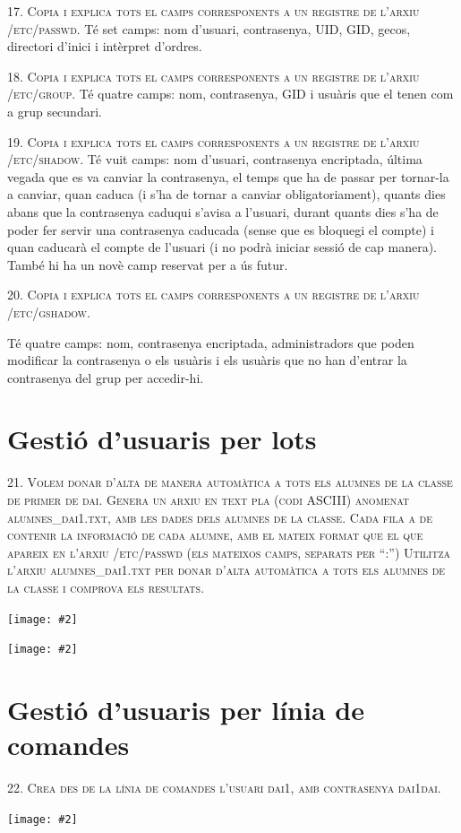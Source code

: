 \documentclass[a4paper,12pt]{article}
\newcommand{\mygraphic}[2][width=\textwidth]{\begin{center}
		\centering\texttt{[image: \#2]}\par
\end{center}}
\begin{document}
\textsc{17. Copia i explica tots el camps corresponents a un registre de l’arxiu /etc/passwd.}
Té set camps: nom d'usuari, contrasenya, UID, GID, gecos, directori d'inici i intèrpret d'ordres.

\textsc{18. Copia i explica tots el camps corresponents a un registre de l’arxiu /etc/group.}
Té quatre camps: nom, contrasenya, GID i usuàris que el tenen com a grup secundari.

\textsc{19. Copia i explica tots el camps corresponents a un registre de l’arxiu /etc/shadow.}
Té vuit camps: nom d'usuari, contrasenya encriptada, última vegada que es va canviar la contrasenya, el temps que ha de passar per tornar-la a canviar, quan caduca (i s'ha de tornar a canviar obligatoriament), quants dies abans que la contrasenya caduqui s'avisa a l'usuari, durant quants dies s'ha de poder fer servir una contrasenya caducada (sense que es bloquegi el compte) i quan caducarà el compte de l'usuari (i no podrà iniciar sessió de cap manera). També hi ha un novè camp reservat per a ús futur.

\textsc{20. Copia i explica tots el camps corresponents a un registre de l’arxiu /etc/gshadow.}

Té quatre camps: nom, contrasenya encriptada, administradors que poden modificar la contrasenya o els usuàris i els usuàris que no han d'entrar la contrasenya del grup per accedir-hi.

\section{Gestió d’usuaris per lots}
\textsc{21. Volem donar d’alta de manera automàtica a tots els alumnes de la classe de primer de dai. Genera un arxiu en text pla (codi ASCIII) anomenat alumnes\_dai1.txt, amb les dades dels alumnes de la classe. Cada fila a de contenir la informació de cada alumne, amb el mateix format que el que apareix en l’arxiu /etc/passwd (els mateixos camps, separats per “:”) Utilitza l’arxiu alumnes\_dai1.txt per donar d’alta automàtica a tots els alumnes de la classe i comprova els resultats.}
\mygraphic{imatges/21a.png}
\mygraphic{imatges/21b.png}

\newpage
\section{Gestió d’usuaris  per línia de comandes}
\textsc{22. Crea des de la línia de comandes l’usuari dai1, amb contrasenya dai1dai. }
\mygraphic{imatges/22.png}
\end{document}
